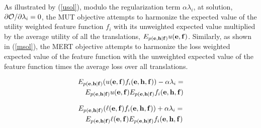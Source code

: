\documentclass[11pt]{article}
\begin{document}
As illustrated by (\ref{usol}), modulo the regularization term $\alpha\lambda_i$, at solution, $\partial {\cal O} / \partial \lambda_i = 0$, the MUT objective attempts to harmonize the expected value of the utility weighted feature function $f_i$ with its unweighted expected value multiplied by the average utility of all the translations, $E_{p({\bf e},{\bf h}|{\bf f})} u({\bf e}, {\bf f})$. Similarly, as shown in (\ref{msol}), the MERT objective attempts to harmonize the loss weighted expected value of the feature function with the unweighted expected value of the feature function times the average loss over all translations. 




\begin{equation}
\begin{split}
E_{p({\bf e},{\bf h}|{\bf f})} (u({\bf e}, {\bf f}) f_i({\bf e},{\bf h},{\bf f})) - \alpha \lambda_i=\\ E_{p({\bf e},{\bf h}|{\bf f})} u({\bf e}, {\bf f}) E_{p({\bf e},{\bf h}|{\bf f})} f_i({\bf e},{\bf h},{\bf f}) 
\end{split}
\label{usol}
\end{equation}

\begin{equation}
\begin{split}
E_{p({\bf e},{\bf h}|{\bf f})} (\ell({\bf e}, {\bf f}) f_i({\bf e},{\bf h},{\bf f})) + \alpha \lambda_i=\\ E_{p({\bf e},{\bf h}|{\bf f})} \ell({\bf e}, {\bf f}) E_{p({\bf e},{\bf h}|{\bf f})} f_i({\bf e},{\bf h},{\bf f}) 
\end{split}
\label{msol}
\end{equation}


\end{document}
